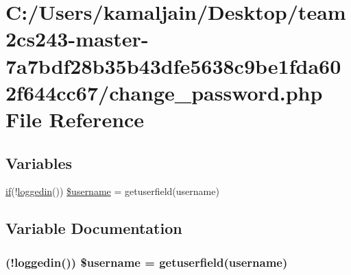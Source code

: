 \hypertarget{change__password_8php}{}\section{C\+:/\+Users/kamaljain/\+Desktop/team2cs243-\/master-\/7a7bdf28b35b43dfe5638c9be1fda602f644cc67/change\+\_\+password.php File Reference}
\label{change__password_8php}
\subsection*{Variables}
\begin{DoxyCompactItemize}
\item 
\hyperlink{login_8php_a6cf3ef86567b2d2e235730bbe61cb311}{if}(!\hyperlink{core_8php_aab6c166eb2634a4ddbacc2f19417fe5c}{loggedin}()) \hyperlink{change__password_8php_acc098a0710d41b208e95c39f094a3e4c}{\$username} = getuserfield(\textquotesingle{}username\textquotesingle{})
\end{DoxyCompactItemize}


\subsection{Variable Documentation}
\subsubsection[{\texorpdfstring{\$username}{$username}}]{ (!{\bf loggedin}()) \$username = getuserfield(\textquotesingle{}username\textquotesingle{})}\hypertarget{change__password_8php_acc098a0710d41b208e95c39f094a3e4c}{}\label{change__password_8php_acc098a0710d41b208e95c39f094a3e4c}
